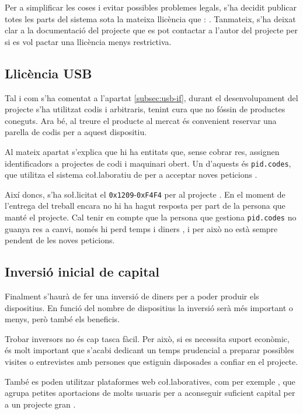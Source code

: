 Per a simplificar les coses i evitar possibles problemes legals, s'ha decidit
publicar totes les parts del sistema sota la mateixa llicència que :
. Tanmateix, s'ha deixat clar a la documentació del projecte que
es pot contactar a l'autor del projecte per si es vol pactar una llicència menys
restrictiva.

\subsection{Llicència USB}

Tal i com s'ha comentat a l'apartat \ref{subsec:usb-if}, durant el desenvolupament
del projecte s'ha utilitzat codis  i  arbitraris, tenint
cura que no fóssin de productes coneguts. Ara bé, al treure el producte al
mercat és convenient reservar una parella de codis per a aquest dispositiu.

Al mateix apartat s'explica que hi ha entitats que, sense cobrar res, assignen
identificadors a projectes de codi i maquinari obert. Un d'aquests és
\texttt{pid.codes}, que utilitza el sistema co\l.laboratiu de  per a
acceptar noves peticions \cite{PidCodes}.

Així doncs, s'ha so\l.licitat el  \texttt{0x1209}-\texttt{0xF4F4}
per al projecte
. En el moment de l'entrega del treball encara no hi ha hagut
resposta per part de la persona que manté el projecte. Cal tenir en compte que
la persona que gestiona \texttt{pid.codes} no guanya res a canvi, només hi perd
temps i diners \cite{PidCodesFaq}, i per això no està sempre pendent de
les noves peticions.

\subsection{Inversió inicial de capital}

Finalment s'haurà de fer una inversió de diners per a poder produir els
dispositius. En funció del nombre de dispositius la inversió serà més important
o menys, però també els beneficis.

Trobar inversors no és cap tasca fàcil. Per això, si es necessita suport
econòmic, és molt important que s'acabi dedicant un temps prudencial a preparar
possibles visites o entrevistes amb persones que estiguin disposades a confiar
en el projecte.

També es poden utilitzar plataformes web co\l.laboratives, com per exemple
, que agrupa petites aportacions de molts usuaris per a
aconseguir suficient capital per a un projecte gran \cite{Kickstarter}.
